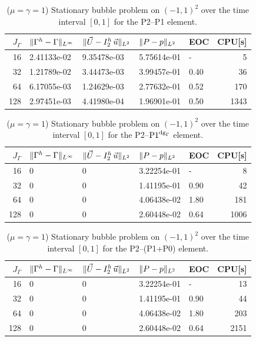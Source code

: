 \begin{table}
\center
\begin{tabular}{rllllr}
\hline
$J_\Gamma$ & $\|\Gamma^h - \Gamma\|_{L^\infty}$ & $\|\vec U - I^h_{2}\,\vec u\|_{L^2}$ & $\|P - p\|_{L^2}$ & EOC & CPU[s] \\
\hline
 16 & 2.41133e-02 & 9.35478e-03 & 5.75614e-01 &    - &    5 \\
 32 & 1.21789e-02 & 3.44473e-03 & 3.99457e-01 & 0.40 &   36 \\
 64 & 6.17055e-03 & 1.24629e-03 & 2.77632e-01 & 0.52 &  170 \\
128 & 2.97451e-03 & 4.41980e-04 & 1.96901e-01 & 0.50 & 1343 \\
\hline
\end{tabular}
\caption[Stokes 2d stationary bubble errors P2--P1]
{($\mu=\gamma=1$) Stationary bubble problem on $(-1,1)^2$ over the time
interval $[0,1]$ for the P2--P1 element.}
\label{tab:stokes_stationary_2d_p2p1}
\end{table}
\begin{table}
\center
\begin{tabular}{rllllr}
\hline
$J_\Gamma$ & $\|\Gamma^h - \Gamma\|_{L^\infty}$ & $\|\vec U - I^h_{2}\,\vec u\|_{L^2}$ & $\|P - p\|_{L^2}$ & EOC & CPU[s] \\
\hline
 16 & 0 & 0 & 3.22254e-01 &    - &    8 \\
 32 & 0 & 0 & 1.41195e-01 & 0.90 &   42 \\
 64 & 0 & 0 & 4.06438e-02 & 1.80 &  181 \\
128 & 0 & 0 & 2.60448e-02 & 0.64 & 1006 \\
\hline
\end{tabular}
\caption[Stokes 2d stationary bubble errors P2--$\pdg$]
{($\mu=\gamma=1$) Stationary bubble problem on $(-1,1)^2$ over the time
interval $[0,1]$ for the P2--$\pdg$ element.}
\label{tab:stokes_stationary_2d_p2p1dg}
\end{table}
\begin{table}
 \center
\begin{tabular}{rllllr}
\hline
$J_\Gamma$ & $\|\Gamma^h - \Gamma\|_{L^\infty}$ & $\|\vec U - I^h_{2}\,\vec u\|_{L^2}$ & $\|P - p\|_{L^2}$ & EOC & CPU[s] \\
\hline
 16 & 0 & 0 & 3.22254e-01 &    - &   13 \\
 32 & 0 & 0 & 1.41195e-01 & 0.90 &   44 \\
 64 & 0 & 0 & 4.06438e-02 & 1.80 &  203 \\
128 & 0 & 0 & 2.60448e-02 & 0.64 & 2151 \\
\hline
\end{tabular}
\caption[Stokes 2d stationary bubble errors P2--(P1+P0)]
{($\mu=\gamma=1$) Stationary bubble problem on $(-1,1)^2$ over the time
interval $[0,1]$ for the P2--(P1+P0) element.}
\label{tab:stokes_stationary_2d_p2p1p0}
\end{table}

